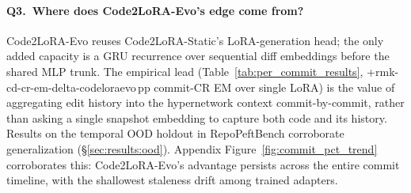 \documentclass{llmxive}
\providecommand{\UseMacro}[1]{\csname rmk-#1\endcsname}
\providecommand{\codelora}{Code2LoRA\xspace}
\providecommand{\repopeftbench}{RepoPeftBench\xspace}
\providecommand{\codelorastatic}{\codelora-Static\xspace}
\providecommand{\codeloraevo}{\codelora-Evo\xspace}
\begin{document}
\paragraph{Q3.\ Where does \codeloraevo{}'s edge come from?}
\codeloraevo{} reuses \codelorastatic{}'s LoRA-generation head; the only added capacity is a GRU recurrence over sequential diff embeddings before the shared MLP trunk.
The empirical lead (Table~\ref{tab:per_commit_results}, +\UseMacro{cd-cr-em-delta-codeloraevo}\,pp commit-CR EM over single LoRA) is the value of aggregating edit history into the hypernetwork context commit-by-commit, rather than asking a single snapshot embedding to capture both code and its history.
Results on the temporal OOD holdout in \repopeftbench{} corroborate generalization (\S\ref{sec:results:ood}).
Appendix Figure~\ref{fig:commit_pct_trend} corroborates this: \codeloraevo{}'s advantage persists across the entire commit timeline, with the shallowest staleness drift among trained adapters.
\end{document}
